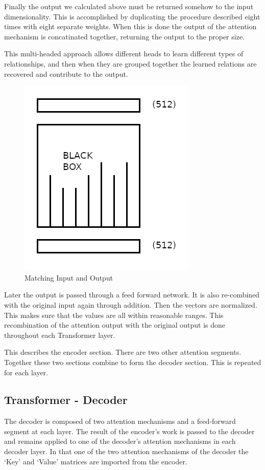 Finally the output we calculated above must be returned somehow to the input dimensionality. This is accomplished by duplicating the procedure described eight times with eight separate weights. When this is done the output of the attention mechanism is concatinated together, returning the output to the proper size.

This multi-headed approach allows different heads to learn different types of relationships, and then when they are grouped together the learned relations are recovered and contribute to the output.

\begin{figure}[H]
	\begin{center}
		
	
	\includegraphics[scale=0.5]{diagram-mat02}
\end{center}
	\caption[Matching Input and Output]{Matching Input and Output}
	

\end{figure}


Later the output is passed through a feed forward network. It is also re-combined with the original input again through addition. Then the vectors are normalized. This makes sure that the values are all within reasonable ranges. This recombination of the attention output with the original output is done throughout each Transformer layer.

This describes the encoder section. There are two other attention segments. Together these two sections combine to form the decoder section. This is repeated for each layer.

\subsection*{Transformer - Decoder}
The decoder is composed of two attention mechanisms and a feed-forward segment at each layer. The result of the encoder's work is passed to the decoder and remains applied to one of the decoder's attention mechanisms in each decoder layer. In that one of the two attention mechanisms of the decoder the `Key' and `Value' matrices are imported from the encoder. 

